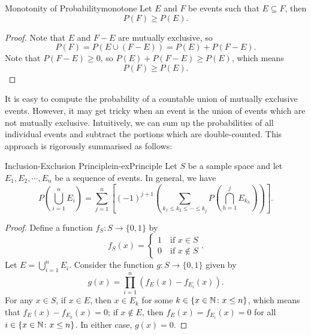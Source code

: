 \documentclass[math]{amznotes}
\theoremstyle{remark}
\newcommand{\0}{\mathbf{0}}
\newcommand{\1}{\mathbf{1}}
\begin{document}
\begin{thmbox}{Monotonity of Probability}{monotone}
    Let $E$ and $F$ be events such that $E \subseteq F$, then 
    \begin{equation*}
        P(F) \geq P(E).
    \end{equation*}
    \tcblower   
    \begin{proof}
        Note that $E$ and $F - E$ are mutually exclusive, so 
        \begin{equation*}
            P(F) = P(E \cup (F - E)) = P(E) + P(F - E).
        \end{equation*}
        Note that $P(F - E) \geq 0$, so $P(E) + P(F - E) \geq P(E)$, which means
        \begin{equation*}
            P(F) \geq P(E).
        \end{equation*}
    \end{proof}
\end{thmbox}
It is easy to compute the probability of a countable union of mutually exclusive events. However, it may get tricky when an event is the union of events which are not mutually exclusive. Intuitively, we can sum up the probabilities of all individual events and subtract the portions which are double-counted. This approach is rigorously summarised as follows:
\begin{thmbox}{Inclusion-Exclusion Principle}{in-exPrinciple}
    Let $S$ be a sample space and let $E_1, E_2, \cdots, E_n$ be a sequence of events. In general, we have
    \begin{equation*}
        P\left(\bigcup_{i = 1}^n E_i\right) = \sum_{j = 1}^{n} \left[(-1)^{j + 1}\left(\sum_{k_1 \leq k_2 \leq \cdots \leq k_j}P\left(\bigcap_{h = 1}^{j}E_{k_h}\right)\right)\right].
    \end{equation*}
    \tcblower
    \begin{proof}
        Define a function $f_S \colon S \to \{0, 1\}$ by
        \begin{equation*}
            f_S(x) = \begin{cases}
                1 \quad \textrm{if } x \in S \\
                0 \quad \textrm{if } x \notin S
            \end{cases}.
        \end{equation*}
        Let $E = \bigcup_{i = 1}^n E_i$. Consider the function $g \colon S \to \{0, 1\}$ given by
        \begin{displaymath}
            g(x) = \prod_{i = 1}^{n}\left(f_E(x) - f_{E_i}(x)\right).
        \end{displaymath}
        For any $x \in S$, if $x \in E$, then $x \in E_k$ for some $k \in \left\{x \in \mathbb{N} \colon x \leq n\right\}$, which means that $f_E(x) - f_{E_k}(x) = 0$; if $x \notin E$, then $f_E(x) = f_{E_i}(x) = 0$ for all $i \in \left\{x \in \mathbb{N} \colon x \leq n\right\}$. In either case, $g(x) = 0$.
    \end{proof}
\end{thmbox}
\end{document}
